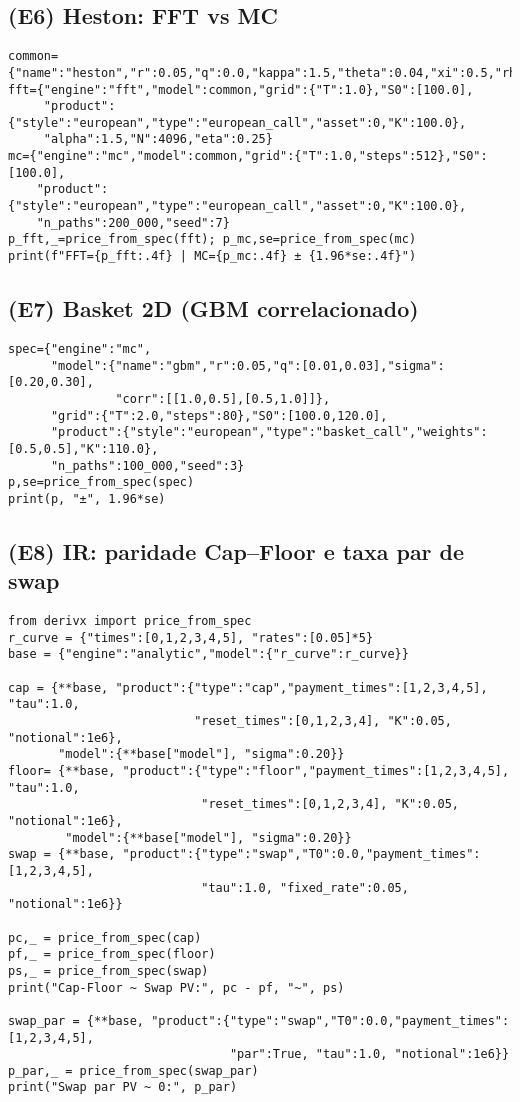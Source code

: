 \documentclass[11pt,a4paper]{article}
\begin{document}
\subsection{(E6) Heston: FFT vs MC}
\begin{lstlisting}[style=pystyle]
common={"name":"heston","r":0.05,"q":0.0,"kappa":1.5,"theta":0.04,"xi":0.5,"rho":-0.7,"v0":0.04}
fft={"engine":"fft","model":common,"grid":{"T":1.0},"S0":[100.0],
     "product":{"style":"european","type":"european_call","asset":0,"K":100.0},
     "alpha":1.5,"N":4096,"eta":0.25}
mc={"engine":"mc","model":common,"grid":{"T":1.0,"steps":512},"S0":[100.0],
    "product":{"style":"european","type":"european_call","asset":0,"K":100.0},
    "n_paths":200_000,"seed":7}
p_fft,_=price_from_spec(fft); p_mc,se=price_from_spec(mc)
print(f"FFT={p_fft:.4f} | MC={p_mc:.4f} ± {1.96*se:.4f}")
\end{lstlisting}

\subsection{(E7) Basket 2D (GBM correlacionado)}
\begin{lstlisting}[style=pystyle]
spec={"engine":"mc",
      "model":{"name":"gbm","r":0.05,"q":[0.01,0.03],"sigma":[0.20,0.30],
               "corr":[[1.0,0.5],[0.5,1.0]]},
      "grid":{"T":2.0,"steps":80},"S0":[100.0,120.0],
      "product":{"style":"european","type":"basket_call","weights":[0.5,0.5],"K":110.0},
      "n_paths":100_000,"seed":3}
p,se=price_from_spec(spec)
print(p, "±", 1.96*se)
\end{lstlisting}

\subsection{(E8) IR: paridade Cap--Floor e taxa par de swap}
\begin{lstlisting}[style=pystyle]
from derivx import price_from_spec
r_curve = {"times":[0,1,2,3,4,5], "rates":[0.05]*5}
base = {"engine":"analytic","model":{"r_curve":r_curve}}

cap = {**base, "product":{"type":"cap","payment_times":[1,2,3,4,5], "tau":1.0,
                          "reset_times":[0,1,2,3,4], "K":0.05, "notional":1e6},
       "model":{**base["model"], "sigma":0.20}}
floor= {**base, "product":{"type":"floor","payment_times":[1,2,3,4,5], "tau":1.0,
                           "reset_times":[0,1,2,3,4], "K":0.05, "notional":1e6},
        "model":{**base["model"], "sigma":0.20}}
swap = {**base, "product":{"type":"swap","T0":0.0,"payment_times":[1,2,3,4,5],
                           "tau":1.0, "fixed_rate":0.05, "notional":1e6}}

pc,_ = price_from_spec(cap)
pf,_ = price_from_spec(floor)
ps,_ = price_from_spec(swap)
print("Cap-Floor ~ Swap PV:", pc - pf, "~", ps)

swap_par = {**base, "product":{"type":"swap","T0":0.0,"payment_times":[1,2,3,4,5],
                               "par":True, "tau":1.0, "notional":1e6}}
p_par,_ = price_from_spec(swap_par)
print("Swap par PV ~ 0:", p_par)
\end{lstlisting}
\end{document}
